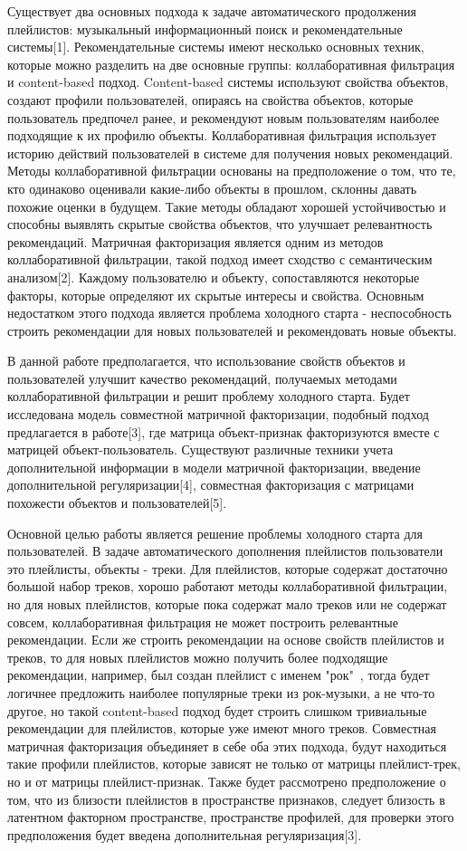 \documentclass[12pt,twoside]{article}
\begin{document}
{Существует два основных подхода к задаче автоматического продолжения плейлистов: музыкальный информационный поиск и рекомендательные системы[1]. Рекомендательные системы имеют несколько основных техник, которые можно разделить на две основные группы: коллаборативная фильтрация и content-based подход. Content-based системы используют свойства объектов, создают профили пользователей, опираясь на свойства объектов, которые пользователь предпочел ранее,  и рекомендуют новым пользователям наиболее подходящие к их профилю объекты. Коллаборативная фильтрация использует историю действий пользователей в системе для получения новых рекомендаций. Методы коллаборативной фильтрации основаны на предположение о том, что те, кто одинаково оценивали какие-либо объекты в прошлом, склонны давать похожие оценки в будущем. Такие методы обладают хорошей устойчивостью и способны выявлять скрытые свойства объектов, что улучшает релевантность рекомендаций. Матричная факторизация является одним из методов коллаборативной фильтрации, такой подход имеет сходство с семантическим анализом[2]. Каждому пользователю и объекту, сопоставляются некоторые факторы, которые определяют их скрытые интересы и свойства. Основным недостатком этого подхода является проблема холодного старта - неспособность строить рекомендации для новых пользователей и рекомендовать новые объекты. 

В данной работе предполагается, что использование свойств объектов и пользователей улучшит качество рекомендаций, получаемых методами коллаборативной фильтрации и  решит проблему  холодного старта. Будет исследована модель совместной матричной факторизации, подобный подход предлагается в работе[3], где матрица объект-признак факторизуются вместе с матрицей объект-пользователь. Существуют различные техники учета дополнительной информации в модели матричной факторизации, введение дополнительной регуляризации[4], совместная факторизация с матрицами похожести объектов и пользователей[5]. 

Основной целью работы является решение проблемы холодного старта для пользователей. В задаче автоматического дополнения плейлистов пользователи это плейлисты, объекты - треки. Для плейлистов, которые содержат достаточно большой набор треков, хорошо работают методы коллаборативной фильтрации, но для новых плейлистов, которые пока содержат мало треков или не содержат совсем, коллаборативная фильтрация не может построить релевантные рекомендации. Если же строить рекомендации на основе свойств плейлистов и треков, то для новых плейлистов можно получить более подходящие рекомендации, например, был создан плейлист с именем "рок"\ , тогда будет логичнее предложить наиболее популярные треки из рок-музыки, а не что-то другое, но такой content-based подход будет строить слишком тривиальные рекомендации для плейлистов, которые уже имеют много треков. Совместная матричная факторизация объединяет в себе оба этих подхода, будут находиться такие профили плейлистов, которые зависят не только от матрицы плейлист-трек, но и от матрицы плейлист-признак. Также будет рассмотрено предположение о том, что из близости плейлистов в пространстве признаков, следует близость в латентном факторном пространстве, пространстве профилей, для проверки этого предположения будет введена дополнительная регуляризация[3].}
\end{document}
